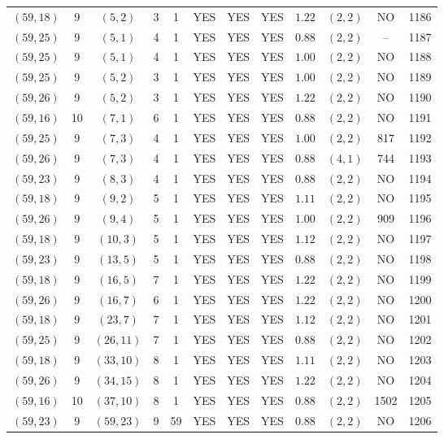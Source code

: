 \begin{longtable}{|c|c|c|c|c|c|c|c|c|c|c|c|}
$(59,18)$ & 9 & $(5,2)$ & 3 & 1 & YES & YES & YES & $1.22$ & $(2,2)$ & NO & 1186\\
$(59,25)$ & 9 & $(5,1)$ & 4 & 1 & YES & YES & YES & $0.88$ & $(2,2)$ & -- & 1187\\
$(59,25)$ & 9 & $(5,1)$ & 4 & 1 & YES & YES & YES & $1.00$ & $(2,2)$ & NO & 1188\\
$(59,25)$ & 9 & $(5,2)$ & 3 & 1 & YES & YES & YES & $1.00$ & $(2,2)$ & NO & 1189\\
$(59,26)$ & 9 & $(5,2)$ & 3 & 1 & YES & YES & YES & $1.22$ & $(2,2)$ & NO & 1190\\
$(59,16)$ & 10 & $(7,1)$ & 6 & 1 & YES & YES & YES & $0.88$ & $(2,2)$ & NO & 1191\\
$(59,25)$ & 9 & $(7,3)$ & 4 & 1 & YES & YES & YES & $1.00$ & $(2,2)$ & 817 & 1192\\
$(59,26)$ & 9 & $(7,3)$ & 4 & 1 & YES & YES & YES & $0.88$ & $(4,1)$ & 744 & 1193\\
$(59,23)$ & 9 & $(8,3)$ & 4 & 1 & YES & YES & YES & $0.88$ & $(2,2)$ & NO & 1194\\
$(59,18)$ & 9 & $(9,2)$ & 5 & 1 & YES & YES & YES & $1.11$ & $(2,2)$ & NO & 1195\\
$(59,26)$ & 9 & $(9,4)$ & 5 & 1 & YES & YES & YES & $1.00$ & $(2,2)$ & 909 & 1196\\
$(59,18)$ & 9 & $(10,3)$ & 5 & 1 & YES & YES & YES & $1.12$ & $(2,2)$ & NO & 1197\\
$(59,23)$ & 9 & $(13,5)$ & 5 & 1 & YES & YES & YES & $0.88$ & $(2,2)$ & NO & 1198\\
$(59,18)$ & 9 & $(16,5)$ & 7 & 1 & YES & YES & YES & $1.22$ & $(2,2)$ & NO & 1199\\
$(59,26)$ & 9 & $(16,7)$ & 6 & 1 & YES & YES & YES & $1.22$ & $(2,2)$ & NO & 1200\\
$(59,18)$ & 9 & $(23,7)$ & 7 & 1 & YES & YES & YES & $1.12$ & $(2,2)$ & NO & 1201\\
$(59,25)$ & 9 & $(26,11)$ & 7 & 1 & YES & YES & YES & $0.88$ & $(2,2)$ & NO & 1202\\
$(59,18)$ & 9 & $(33,10)$ & 8 & 1 & YES & YES & YES & $1.11$ & $(2,2)$ & NO & 1203\\
$(59,26)$ & 9 & $(34,15)$ & 8 & 1 & YES & YES & YES & $1.22$ & $(2,2)$ & NO & 1204\\
$(59,16)$ & 10 & $(37,10)$ & 8 & 1 & YES & YES & YES & $0.88$ & $(2,2)$ & 1502 & 1205\\
$(59,23)$ & 9 & $(59,23)$ & 9 & 59 & YES & YES & YES & $0.88$ & $(2,2)$ & NO & 1206\\

\end{longtable}
